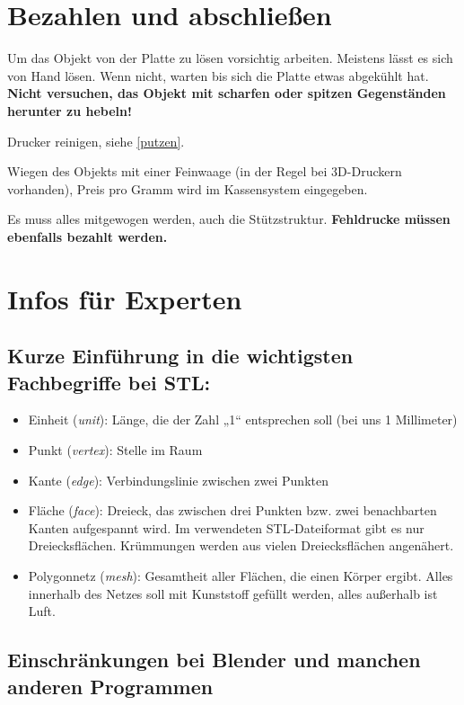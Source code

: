 \documentclass{\basedir/fablab-document}
\newcommand{\fachbegriff}[1]{(\textit{#1})}
\begin{document}
\section{Bezahlen und abschließen}

Um das Objekt von der Platte zu lösen vorsichtig arbeiten. Meistens lässt es sich von Hand lösen. Wenn nicht,
warten bis sich die Platte etwas abgekühlt hat. \textbf{Nicht versuchen, das Objekt mit scharfen oder spitzen Gegenständen herunter zu hebeln!}

Drucker reinigen, siehe \ref{putzen}.

Wiegen des Objekts mit einer Feinwaage (in der Regel bei 3D-Druckern vorhanden), Preis pro Gramm wird im Kassensystem eingegeben.

Es muss alles mitgewogen werden, auch die Stützstruktur. 
\textbf{Fehldrucke müssen ebenfalls bezahlt werden.}

\pagebreak


\section{Infos für Experten}

\subsection{Kurze Einführung in die wichtigsten Fachbegriffe bei STL:}

\begin{itemize}
\item Einheit \fachbegriff{unit}: Länge, die der Zahl „1“ entsprechen soll (bei uns
1 Millimeter)
\item Punkt \fachbegriff{vertex}: Stelle im Raum
\item Kante \fachbegriff{edge}: Verbindungslinie zwischen zwei Punkten
\item Fläche \fachbegriff{face}: Dreieck, das zwischen drei Punkten bzw. zwei
benachbarten Kanten aufgespannt wird. Im verwendeten STL-Dateiformat
gibt es nur Dreiecksflächen. Krümmungen werden aus vielen
Dreiecksflächen angenähert.
\item Polygonnetz \fachbegriff{mesh}: Gesamtheit aller Flächen, die einen Körper
ergibt. Alles innerhalb des Netzes soll mit Kunststoff gefüllt werden,
alles außerhalb ist Luft.
\end{itemize}

\subsection{Einschränkungen bei Blender und manchen anderen Programmen} \label{lowlevel-einschraenkungen}
\end{document}
